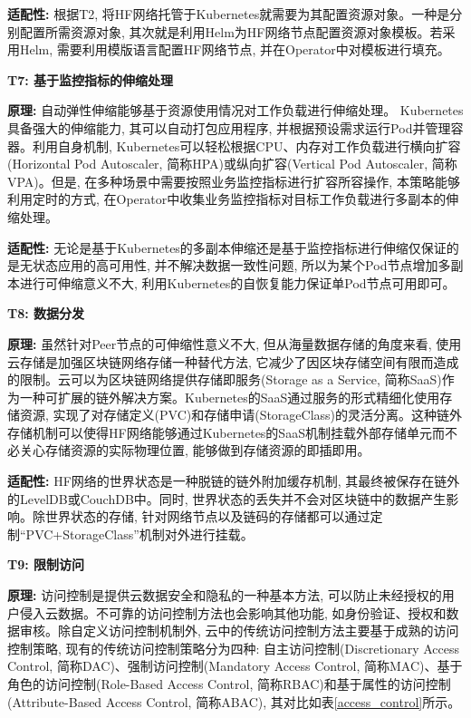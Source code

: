 \textbf{适配性: } 根据T2, 将HF网络托管于Kubernetes就需要为其配置资源对象。一种是分别配置所需资源对象, 其次就是利用Helm为HF网络节点配置资源对象模板。若采用Helm, 需要利用模版语言配置HF网络节点, 并在Operator中对模板进行填充。


\textbf{T7: 基于监控指标的伸缩处理}

\textbf{原理: } 自动弹性伸缩能够基于资源使用情况对工作负载进行伸缩处理。 Kubernetes具备强大的伸缩能力, 其可以自动打包应用程序, 并根据预设需求运行Pod并管理容器。利用自身机制, Kubernetes可以轻松根据CPU、内存对工作负载进行横向扩容(Horizontal Pod Autoscaler, 简称HPA)或纵向扩容(Vertical Pod Autoscaler, 简称VPA)。但是, 在多种场景中需要按照业务监控指标进行扩容所容操作, 本策略能够利用定时的方式, 在Operator中收集业务监控指标对目标工作负载进行多副本的伸缩处理。

\textbf{适配性: } 无论是基于Kubernetes的多副本伸缩还是基于监控指标进行伸缩仅保证的是无状态应用的高可用性, 并不解决数据一致性问题, 所以为某个Pod节点增加多副本进行可伸缩意义不大, 利用Kubernetes的自恢复能力保证单Pod节点可用即可。

\textbf{T8: 数据分发}

\textbf{原理: } 虽然针对Peer节点的可伸缩性意义不大, 但从海量数据存储的角度来看, 使用云存储是加强区块链网络存储一种替代方法, 它减少了因区块存储空间有限而造成的限制\cite{gai2020blockchain}。云可以为区块链网络提供存储即服务(Storage as a Service, 简称SaaS)作为一种可扩展的链外解决方案。Kubernetes的SaaS通过服务的形式精细化使用存储资源, 实现了对存储定义(PVC)和存储申请(StorageClass)的灵活分离。这种链外存储机制可以使得HF网络能够通过Kubernetes的SaaS机制挂载外部存储单元而不必关心存储资源的实际物理位置, 能够做到存储资源的即插即用。 

\textbf{适配性: }HF网络的世界状态是一种脱链的链外附加缓存机制, 其最终被保存在链外的LevelDB或CouchDB中。同时, 世界状态的丢失并不会对区块链中的数据产生影响。除世界状态的存储, 针对网络节点以及链码的存储都可以通过定制“PVC+StorageClass”机制对外进行挂载。

\textbf{T9: 限制访问}

\textbf{原理: }访问控制是提供云数据安全和隐私的一种基本方法, 可以防止未经授权的用户侵入云数据。不可靠的访问控制方法也会影响其他功能, 如身份验证、授权和数据审核。除自定义访问控制机制外, 云中的传统访问控制方法主要基于成熟的访问控制策略, 现有的传统访问控制策略分为四种: 自主访问控制(Discretionary Access Control, 简称DAC)、强制访问控制(Mandatory Access Control, 简称MAC)、基于角色的访问控制(Role-Based Access Control, 简称RBAC)和基于属性的访问控制(Attribute-Based Access Control, 简称ABAC), 其对比如表\ref{access_control}所示。

